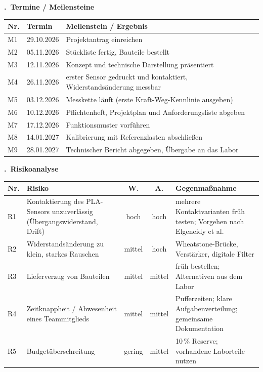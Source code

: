 \documentclass[11pt,a4paper]{article}
\newif\ifhinweise
\newcommand{\hinweis}[1]{\ifhinweise{\color{hinweisgrau}\small\itshape #1\par}\fi}
\newcounter{feldnr}
\newcommand{\formfeld}[1]{%
  \par\medskip\Needspace{6\baselineskip}\noindent
  \stepcounter{feldnr}%
  \colorbox{bhtgrau}{\parbox{\dimexpr\linewidth-2\fboxsep}{\textbf{\thefeldnr.\ #1}}}%
  \par\smallskip}
\begin{document}
\formfeld{Termine / Meilensteine}
\hinweis{Mindestens vier, nicht nur Semestertermine: eigene Meilensteine ergänzen (z.\,B. Sensor kontaktiert, Messschaltung läuft, Kalibrierung abgeschlossen). Die Semestertermine stehen in Semester\_Aktuelle\_Planung.pdf, S.\,6.}
\begin{tabularx}{\linewidth}{|l|l|X|}
\hline
\rowcolor{bhtgrau}\textbf{Nr.} & \textbf{Termin} & \textbf{Meilenstein / Ergebnis} \\ \hline
M1 & 29.10.2026 & Projektantrag einreichen \\ \hline
M2 & 05.11.2026 & Stückliste fertig, Bauteile bestellt \\ \hline
M3 & 12.11.2026 & Konzept und technische Darstellung präsentiert \\ \hline
M4 & 26.11.2026 & erster Sensor gedruckt und kontaktiert, Widerstandsänderung messbar \\ \hline %
M5 & 03.12.2026 & Messkette läuft (erste Kraft-Weg-Kennlinie ausgeben) \\ \hline
M6 & 10.12.2026 & Pflichtenheft, Projektplan und Anforderungsliste abgeben \\ \hline
M7 & 17.12.2026 & Funktionsmuster vorführen \\ \hline
M8 & 14.01.2027 &  Kalibrierung mit Referenzlasten abschließen \\ \hline
M9 & 28.01.2027 & Technischer Bericht abgegeben, Übergabe an das Labor \\ \hline
\end{tabularx}

\formfeld{Risikoanalyse}
\begin{tabularx}{\linewidth}{|l|X|c|c|X|}
\hline
\rowcolor{bhtgrau}\textbf{Nr.} & \textbf{Risiko} & \textbf{W.} & \textbf{A.} & \textbf{Gegenmaßnahme} \\ \hline
R1 & Kontaktierung des PLA-Sensors unzuverlässig (Übergangswiderstand, Drift) & hoch & hoch & mehrere Kontaktvarianten früh testen; Vorgehen nach Elgeneidy et al. \\ \hline
R2 & Widerstandsänderung zu klein, starkes Rauschen & mittel & hoch & Wheatstone-Brücke, Verstärker, digitale Filter \\ \hline
R3 & Lieferverzug von Bauteilen & mittel & mittel & früh bestellen; Alternativen aus dem Labor \\ \hline
R4 & Zeitknappheit / Abwesenheit eines Teammitglieds & mittel & mittel & Pufferzeiten; klare Aufgabenverteilung; gemeinsame Dokumentation \\ \hline
R5 & Budgetüberschreitung & gering & mittel & 10\,\% Reserve; vorhandene Laborteile nutzen \\ \hline
\end{tabularx}
\end{document}
